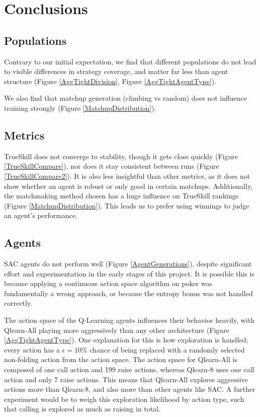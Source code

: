 \chapter{Conclusions}

\section{Populations}
Contrary to our initial expectation, we find that different populations do not lead to visible differences in strategy coverage, and matter far less than agent structure (Figure \ref{AggTightDivision}, Figure \ref{AggTightAgentType}).

We also find that matchup generation (climbing vs random) does not influence training strongly (Figure \ref{MatchupDistribution}).

\section{Metrics}
TrueSkill does not converge to stability, though it gets close quickly (Figure \ref{TrueSkillCompare}), nor does it stay consistent between runs (Figure \ref{TrueSkillCompare2}). It is also less insightful than other metrics, as it does not show whether an agent is robust or only good in certain matchups. 
Additionally, the matchmaking method chosen has a huge influence on TrueSkill rankings (Figure \ref{MatchupDistribution}). This leads us to prefer using winnings to judge an agent's performance.


\section{Agents}
SAC agents do not perform well (Figure \ref{AgentGenerations}), despite significant effort and experimentation in the early stages of this project. It is possible this is because applying a continuous action space algorithm on poker was fundamentally a wrong approach, or because the entropy bonus was not handled correctly.


The action space of the Q-Learning agents influences their behavior heavily, with Qlearn-All playing more aggressively than any other architecture (Figure \ref{AggTightAgentType}).
One explanation for this is how exploration is handled; every action has a $\epsilon = 10\%$ chance of being replaced with a randomly selected non-folding action from the action space. The action space for Qlearn-All is composed of one call action and 199 raise actions, whereas Qlearn-8 uses one call action and only 7  raise actions. This means that Qlearn-All explores aggressive actions more than Qlearn-8, and also more than other agents like SAC. A further experiment would be to weigh this exploration likelihood by action type, such that calling is explored as much as raising in total. 